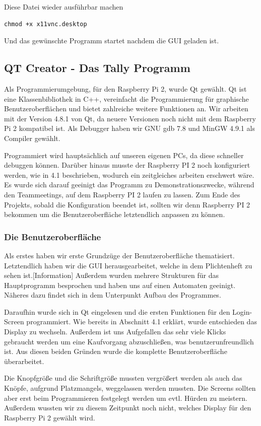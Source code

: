\documentclass[11pt,a4paper]{article} %
\begin{document}
Diese Datei wieder ausführbar machen
\begin{frame}

\begin{lstlisting}
chmod +x x11vnc.desktop
\end{lstlisting}
\end{frame}
Und das gewünschte Programm startet nachdem die GUI geladen ist.

\newpage

\subsection{QT Creator - Das Tally Programm}
Als Programmierumgebung, für den Raspberry Pi 2, wurde Qt gewählt. \cite{13}
Qt ist eine Klassenbibliothek in C++, vereinfacht die Programmierung für graphische Benutzeroberflächen und bietet zahlreiche weitere Funktionen an.
Wir arbeiten mit der Version 4.8.1 von Qt, da neuere Versionen noch nicht mit dem Raspberry Pi 2 kompatibel ist.
Als Debugger haben wir GNU gdb 7.8 und MinGW 4.9.1 als Compiler gewählt.
\par
Programmiert wird hauptsächlich auf unseren eigenen PCs, da diese schneller debuggen können.
Darüber hinaus musste der Raspberry PI 2 noch konfiguriert werden, wie in 4.1 beschrieben, wodurch ein zeitgleiches arbeiten erschwert wäre.
Es wurde sich darauf geeinigt das Programm zu Demonstrationszwecke, während den Teammeetings, auf dem Raspberry PI 2 laufen zu lassen.
Zum Ende des Projekts, sobald die Konfiguration beendet ist, sollten wir denn Raspberry PI 2 bekommen um die Benutzeroberfläche letztendlich anpassen zu können.
\par
\subsubsection{Die Benutzeroberfläche}
Als erstes haben wir erste Grundzüge der Benutzeroberfläche thematisiert. Letztendlich haben wir die GUI herausgearbeitet, welche in dem Plichtenheft zu sehen ist.[Information]
Außerdem wurden mehrere Strukturen für das Hauptprogramm besprochen und haben uns auf einen Automaten geeinigt. Näheres dazu findet sich in dem Unterpunkt Aufbau des Programmes.
\par
Daraufhin wurde sich in Qt eingelesen und die ersten Funktionen für den Login-Screen programmiert. \cite{14} \cite{15}
Wie bereits in Abschnitt 4.1 erklärt, wurde entschieden das Display zu wechseln.
Außerdem ist uns Aufgefallen das sehr viele Klicks gebraucht werden um eine Kaufvorgang abzuschließen, was benutzerunfreundlich ist.
Aus diesen beiden Gründen wurde die komplette Benutzeroberfläche überarbeitet.
\par
Die Knopfgröße und die Schriftgröße mussten vergrößert werden als auch das Knöpfe, aufgrund Platzmangels, weggelassen werden mussten.
Die Screens sollten aber erst beim Programmieren festgelegt werden um evtl. Hürden zu meistern.
Außerdem wussten wir zu diesem Zeitpunkt noch nicht, welches Display für den Raspberry Pi 2 gewählt wird.
\par
\end{document}
